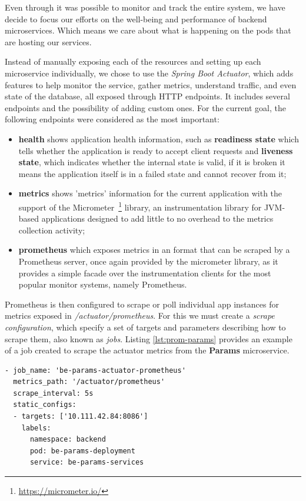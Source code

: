 Even through it was possible to monitor and track the entire system, we have decide to focus our efforts on the well-being and performance of backend microservices. Which means we care about what is happening on the pods that are hosting our services. 

Instead of manually exposing each of the resources and setting up each microservice individually, we chose to use the \textit{Spring Boot Actuator}, which adds features to help monitor the service, gather metrics, understand traffic, and even state of the database, all exposed through HTTP endpoints. It includes several endpoints and the possibility of adding custom ones. For the current goal, the following endpoints were considered as the most important:

\begin{itemize}
    \item \textbf{health} shows application health information, such as \textbf{readiness state} which tells whether the application is ready to accept client requests and \textbf{liveness state}, which indicates whether the internal state is valid, if it is broken it means the application itself is in a failed state and cannot recover from it;
    \item \textbf{metrics} shows 'metrics' information for the current application with the support of the Micrometer~\footnote{\url{https://micrometer.io/}} library, an instrumentation library for JVM-based applications designed to add little to no overhead to the metrics collection activity;
    \item \textbf{prometheus} which exposes metrics in an format that can be scraped by a Prometheus server, once again provided by the micrometer library, as it provides a simple facade over the instrumentation clients for the most popular monitor systems, namely Prometheus.
\end{itemize}

Prometheus is then configured to scrape or poll individual app instances for metrics exposed in \textit{/actuator/prometheus}. For this we must create a \textit{scrape configuration}, which specify a set of targets and parameters describing how to scrape them, also known as \textit{jobs}. Listing \ref{lst:prom-params} provides an example of a job created to scrape the actuator metrics from the \textbf{Params} microservice.

\begin{lstlisting}[caption={Prometheus job for params microservice}, label={lst:prom-params}, captionpos=b]
- job_name: 'be-params-actuator-prometheus'
  metrics_path: '/actuator/prometheus'
  scrape_interval: 5s
  static_configs:
  - targets: ['10.111.42.84:8086']
    labels:
      namespace: backend
      pod: be-params-deployment
      service: be-params-services
\end{lstlisting}

